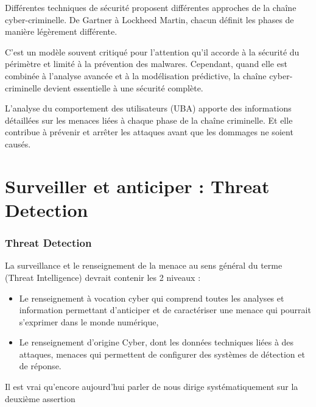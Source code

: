 Différentes techniques de sécurité proposent différentes approches de la chaîne cyber-criminelle. De Gartner à Lockheed Martin, chacun définit les phases de manière légèrement différente.

C’est un modèle souvent critiqué pour l’attention qu’il accorde à la sécurité du périmètre et limité à la prévention des malwares. Cependant, quand elle est combinée à l’analyse avancée et à la modélisation prédictive, la chaîne cyber-criminelle devient essentielle à une sécurité complète.

L’analyse du comportement des utilisateurs (UBA) apporte des informations détaillées sur les menaces liées à chaque phase de la chaîne criminelle. Et elle contribue à prévenir et arrêter les attaques avant que les dommages ne soient causés.



\section{Surveiller et anticiper : Threat Detection}

\begin{frame}
\frametitle<presentation>{Threat Detection}
La surveillance et le renseignement de la menace au sens général du terme (Threat Intelligence) devrait contenir les 2 niveaux :

\begin{itemize}
  \item Le renseignement à vocation cyber qui comprend toutes les analyses et information permettant d'anticiper et de caractériser une menace qui pourrait s'exprimer dans le monde numérique,
  \item Le renseignement d'origine Cyber, dont les données techniques liées à des attaques, menaces qui permettent de configurer des systèmes de détection et de réponse.
\end{itemize}

\end{frame}

Il est vrai qu'encore aujourd'hui parler de  nous dirige systématiquement sur la deuxième assertion


